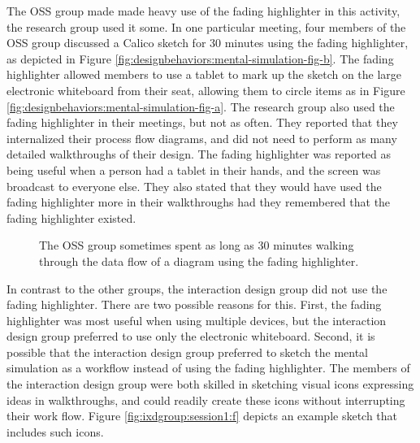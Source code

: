 \documentclass[12pt,fleqn]{ucithesis}
\begin{document}
The OSS group made made heavy use of the fading highlighter in this activity, the research group used it some. In one particular meeting, four members of the OSS group discussed a Calico sketch for 30 minutes using the fading highlighter, as depicted in Figure \ref{fig:designbehaviors:mental-simulation-fig-b}. The fading highlighter allowed members to use a tablet to mark up the sketch on the large electronic whiteboard from their seat, allowing them to circle items as in Figure \ref{fig:designbehaviors:mental-simulation-fig-a}.  The research group also used the fading highlighter in their meetings, but not as often. They reported that they internalized their process flow diagrams, and did not need to perform as many detailed walkthroughs of their design. The fading highlighter was reported as being useful when a person had a tablet in their hands, and the screen was broadcast to everyone else. They also stated that they would have used the fading highlighter more in their walkthroughs had they remembered that the fading highlighter existed.

\begin{figure}%
  \centering
   \caption {The OSS group sometimes spent as long as 30 minutes walking through the data flow of a diagram using the fading highlighter.}
   \label{fig:designbehaviors:mental-simulation-fig}   
\end{figure}%

In contrast to the other groups, the interaction design group did not use the fading highlighter. There are two possible reasons for this. First, the fading highlighter was most useful when using multiple devices, but the interaction design group preferred to use only the electronic whiteboard. Second, it is possible that the interaction design group preferred to sketch the mental simulation as a workflow instead of using the fading highlighter. The members of the interaction design group were both skilled in sketching visual icons expressing ideas in walkthroughs, and could readily create these icons without interrupting their work flow. Figure \ref{fig:ixdgroup:session1:f} depicts an example sketch that includes such icons.
\end{document}
